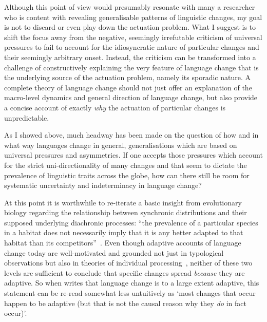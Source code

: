 Although this point of view would presumably resonate with many a researcher who is content with revealing generalisable patterns of linguistic changes, my goal is not to discard or even play down the actuation problem. 
What I suggest is to shift the focus away from the negative, seemingly irrefutable criticism of universal pressures to fail to account for the idiosyncratic nature of particular changes and their seemingly arbitrary onset. Instead, the criticism can be transformed into a challenge of constructively explaining the very feature of language change that is the underlying source of the actuation problem, namely its sporadic nature.
A complete theory of language change should not just offer an explanation of the macro-level dynamics and general direction of language change, but also provide a concise account of exactly \emph{why} the actuation of particular changes is unpredictable. %

As I showed above, much headway has been made on the question of how and in what way languages change in general, generalisations which are based on universal pressures and asymmetries. If one accepts those pressures which account for the strict uni-directionality of many changes and that seem to dictate the prevalence of linguistic traits across the globe, how can there still be room for systematic uncertainty and indeterminacy in language change?

At this point it is worthwhile to re-iterate a basic insight from evolutionary biology regarding the relationship between synchronic distributions and their supposed underlying diachronic processes: ``the prevalence of a particular species in a habitat does not necessarily imply that it is any better adapted to that habitat than its competitors''~\citep[p.2]{Blythe2012copying}.
Even though adaptive accounts of language change today are well-motivated and grounded not just in typological observations but also in theories of individual processing~\citep{Kirby1999,Jaeger2010}, neither of these two levels are sufficient to conclude that specific changes spread \emph{because} they are adaptive. So when \citet{Wichmann2015} writes that language change is to a large extent adaptive, this statement can be re-read somewhat less untuitively as `most changes that occur happen to be adaptive (but that is not the causal reason why they \emph{do} in fact occur)'.

